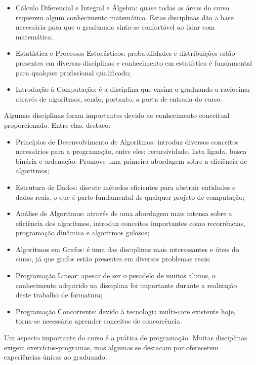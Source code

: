 \begin{itemize}
	\item Cálculo Diferencial e Integral e Álgebra: quase todas as áreas do curso requerem algum
	conhecimento matemático. Estas disciplinas dão a base necessária para que o graduando
	sinta-se confortável ao lidar com matemática;
	\item Estatística e Processos Estocásticos: probabilidades e distribuições estão presentes
	em diversas disciplinas e conhecimento em estatística é fundamental para qualquer
profissional qualificado;
	\item Introdução à Computação: é a disciplina que ensina o graduando a raciocinar através
	de algoritmos, sendo, portanto, a porta de entrada do curso.
\end{itemize}

Algumas disciplinas foram importantes devido ao conhecimento conceitual proporcionado. Entre elas,
destaco:

\begin{itemize}
	\item Princípios de Desenvolvimento de Algoritmos: introduz diversos conceitos necessários
	para a programação, entre eles: recursividade, lista ligada, busca binária e ordenação.
	Promove uma primeira abordagem sobre a eficiência de algoritmos;
	\item Estrutura de Dados: discute métodos eficientes para abstrair entidades e dados reais,
	o que é parte fundamental de qualquer projeto de computação;
	\item Análise de Algoritmos: através de uma abordagem mais intensa sobre a eficiência dos
	algoritmos, introduz conceitos importantes como recorrências, programação dinâmica e
	algoritmos gulosos;
	\item Algoritmos em Grafos: é uma das disciplinas mais interessantes e úteis do curso, já
	que grafos estão presentes em diversos problemas reais;
	\item Programação Linear: apesar de ser o pesadelo de muitos alunos, o conhecimento
	adquirido na disciplina foi importante durante a realização deste trabalho de formatura;
	\item Programação Concorrente: devido à tecnologia multi-core existente hoje, torna-se
	necessário aprender conceitos de concorrência.
\end{itemize}

Um aspecto importante do curso é a prática de programação. Muitas disciplinas exigem
exercícios-programas, mas algumas se destacam por oferecerem experiências únicas ao graduando:

